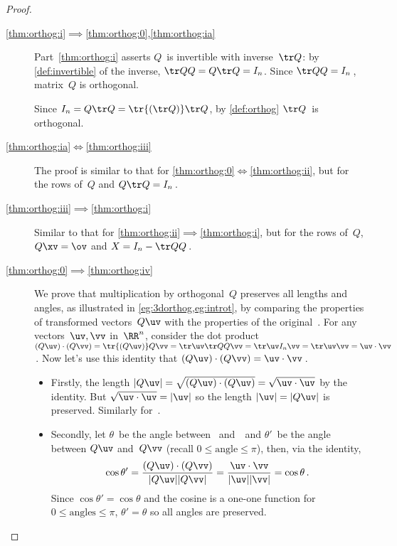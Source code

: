 \begin{proof}
\begin{description}
\item[\ref{thm:orthog:i}$\implies$\ref{thm:orthog:0},\ref{thm:orthog:ia}]
Part~\ref{thm:orthog:i} asserts \(Q\)~is invertible with inverse~\(\tr Q\): by \cref{def:invertible} of the inverse, \(\tr QQ=Q\tr Q=I_n\).  
Since \(\tr QQ=I_n\)\,, matrix~\(Q\) is orthogonal.
 
Since \(I_n=Q\tr Q=\tr{(\tr Q)}\tr Q\), by \cref{def:orthog} \(\tr Q\)~is orthogonal.

\item[\ref{thm:orthog:ia}$\iff$\ref{thm:orthog:iii}] 
The proof is similar to that for \ref{thm:orthog:0}$\iff$\ref{thm:orthog:ii}, but for the rows of~\(Q\) and \(Q\tr Q=I_n\)\,.

\item[\ref{thm:orthog:iii}$\implies$\ref{thm:orthog:i}] 
Similar to that for \ref{thm:orthog:ii}$\implies$\ref{thm:orthog:i}, but for the rows of~\(Q\), \(Q\xv=\ov\) and \(X=I_n-\tr QQ\)\,.

\item[\ref{thm:orthog:0}$\implies$\ref{thm:orthog:iv}] 
We prove that multiplication by orthogonal~\(Q\) preserves all lengths and angles, as illustrated in \cref{eg:3dorthog,eg:introt}, by comparing the properties of transformed vectors~\(Q\uv\) with the properties of the original~\uv.
For any vectors~\(\uv,\vv\) in~\(\RR^n\), consider the dot product
\((Q\uv)\cdot(Q\vv)=\tr{(Q\uv)}Q\vv
=\tr\uv\tr QQ\vv
=\tr\uv I_n\vv
=\tr\uv\vv=\uv\cdot\vv\)\,.  
Now let's use this identity that \((Q\uv)\cdot(Q\vv)=\uv\cdot\vv\)\,.
\begin{itemize}
\item Firstly, the length \(|Q\uv|=\sqrt{(Q\uv)\cdot(Q\uv)}=\sqrt{\uv\cdot\uv}\) by the identity.  But \(\sqrt{\uv\cdot\uv}=|\uv|\) so the length \(|\uv|=|Q\uv|\) is preserved. 
Similarly for~\vv.
\item Secondly, let \(\theta\)~be the angle between \uv\ and~\vv\ and \(\theta'\)~be the angle between \(Q\uv\) and~\(Q\vv\) (recall \(0\leq\text{angle}\leq\pi\)), then, via the identity,
\begin{equation*}
\cos\theta'=\frac{(Q\uv)\cdot(Q\vv)}{|Q\uv||Q\vv|}
=\frac{\uv\cdot \vv}{|\uv||\vv|}
=\cos\theta\,.
\end{equation*}
Since \(\cos\theta'=\cos\theta\) and the cosine is a one-one function for \(0\leq\text{angles}\leq\pi\), \(\theta'=\theta\) so all angles are preserved.
\end{itemize}


\end{description}
\end{proof}
